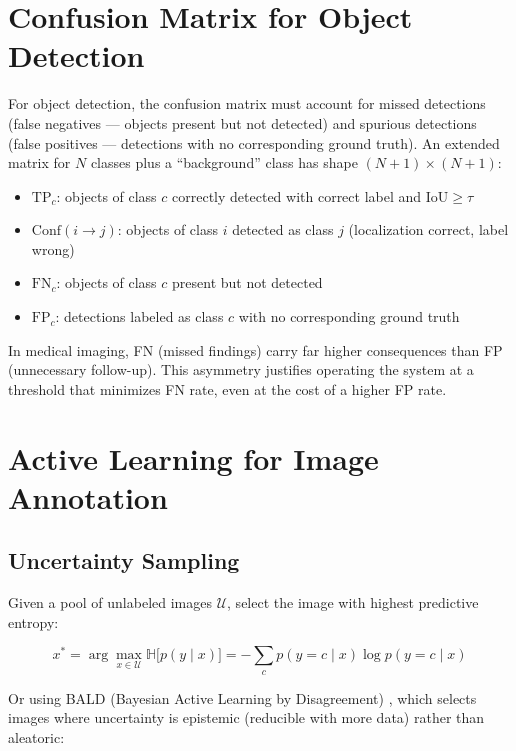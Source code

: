 \section{Confusion Matrix for Object Detection}

For object detection, the confusion matrix must account for missed detections (false negatives — objects present but not detected) and spurious detections (false positives — detections with no corresponding ground truth). An extended matrix for $N$ classes plus a ``background'' class has shape $(N+1) \times (N+1)$:

\begin{itemize}
    \item $\text{TP}_c$: objects of class $c$ correctly detected with correct label and $\text{IoU} \geq \tau$
    \item $\text{Conf}(i \to j)$: objects of class $i$ detected as class $j$ (localization correct, label wrong)
    \item $\text{FN}_c$: objects of class $c$ present but not detected
    \item $\text{FP}_c$: detections labeled as class $c$ with no corresponding ground truth
\end{itemize}

In medical imaging, FN (missed findings) carry far higher consequences than FP (unnecessary follow-up). This asymmetry justifies operating the system at a threshold that minimizes FN rate, even at the cost of a higher FP rate.

\section{Active Learning for Image Annotation}

\subsection{Uncertainty Sampling}

Given a pool of unlabeled images $\mathcal{U}$, select the image with highest predictive entropy:

\[
x^* = \arg\max_{x \in \mathcal{U}} \mathbb{H}\bigl[p(y \mid x)\bigr]
    = -\sum_c p(y=c \mid x)\log p(y=c \mid x)
\]

Or using BALD (Bayesian Active Learning by Disagreement) \autocite{houlsby2011bald}, which selects images where uncertainty is epistemic (reducible with more data) rather than aleatoric:

